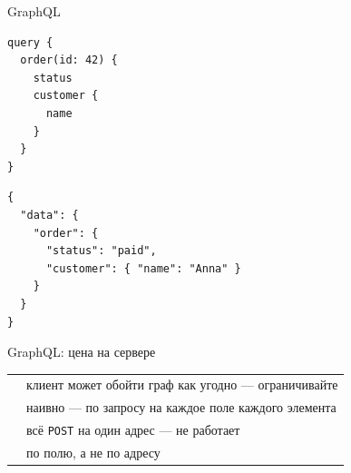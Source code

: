 \documentclass[aspectratio=169,10pt,t]{beamer}
\newcommand{\codesm}{\ttfamily\fontsize{7.6}{9.0}\selectfont}
\begin{document}
\begin{frame}[plain]
\end{frame}

\begin{frame}[fragile]{GraphQL}
  \slidetop

  \begin{minipage}[t]{0.40\textwidth}
    \par\vspace{0.4em}
\begin{lstlisting}[style=plain,basicstyle=\codesm]
query {
  order(id: 42) {
    status
    customer {
      name
    }
  }
}
\end{lstlisting}
  \end{minipage}\hfill
  \begin{minipage}[t]{0.55\textwidth}
    \par\vspace{0.4em}
\begin{lstlisting}[style=json,basicstyle=\codesm]
{
  "data": {
    "order": {
      "status": "paid",
      "customer": { "name": "Anna" }
    }
  }
}
\end{lstlisting}
  \end{minipage}

  \slidegap
\end{frame}

\begin{frame}{GraphQL: цена на сервере}
  \slidetop
  {\renewcommand{\arraystretch}{1.75}
  \begin{tabular}{@{}L{3.6cm}L{9.2cm}@{}}
             & клиент может обойти граф как угодно ---
      ограничивайте \\
      & наивно --- по запросу на каждое поле каждого
      элемента \\
            & всё \texttt{POST} на один адрес --- не
      работает \\
         & по полю, а не по адресу \\
  \end{tabular}}

  \slidegap
\end{frame}
\end{document}
